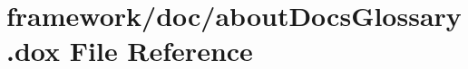 \hypertarget{about_docs_glossary_8dox}{}\section{framework/doc/about\+Docs\+Glossary.dox File Reference}
\label{about_docs_glossary_8dox}
